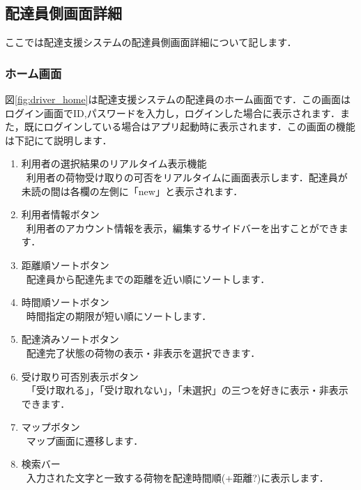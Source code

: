 \documentclass[a4j,titlepage]{jarticle}
\begin{document}
\subsection{配達員側画面詳細}
ここでは配達支援システムの配達員側画面詳細について記します．

\subsubsection{ホーム画面}
図\ref{fig:driver_home}は配達支援システムの配達員のホーム画面です．この画面はログイン画面でID,パスワードを入力し，ログインした場合に表示されます．また，既にログインしている場合はアプリ起動時に表示されます．この画面の機能は下記にて説明します．
\begin{enumerate}
	\item 利用者の選択結果のリアルタイム表示機能\\
	 \ 利用者の荷物受け取りの可否をリアルタイムに画面表示します．配達員が未読の間は各欄の左側に「new」と表示されます．
	\item 利用者情報ボタン\\
	 \ 利用者のアカウント情報を表示，編集するサイドバーを出すことができます．
	\item 距離順ソートボタン\\
	 \ 配達員から配達先までの距離を近い順にソートします．
	\item 時間順ソートボタン\\
   \ 時間指定の期限が短い順にソートします．
	\item 配達済みソートボタン\\
   \ 配達完了状態の荷物の表示・非表示を選択できます．
	\item 受け取り可否別表示ボタン\\
	 \ 「受け取れる」，「受け取れない」，「未選択」の三つを好きに表示・非表示できます．
	\item マップボタン\\
   \ マップ画面に遷移します．
	\item 検索バー\\
	 \ 入力された文字と一致する荷物を配達時間順(+距離?)に表示します．
\end{enumerate}
\end{document}
